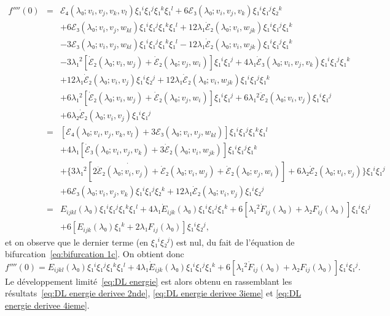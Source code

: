\documentclass[12pt, final]{amsart}
\theoremstyle{definition}
\begin{document}
\begin{eqnarray*}
  f'''' (0) & = & ℰ₄ (λ₀ ; v_i, v_j, v_k {, v_l} ) ξ₁^i
  ξ₁^j ξ₁^k ξ₁^l + 6ℰ₃ (λ₀ ; v_i, v_j, v_k) ξ₁^i
  ξ₁^j ξ₂^k\\
  &  &  + 6ℰ₃ (λ₀ ; v_i, v_j, w_{k  l})
  ξ₁^i ξ₁^j ξ₁^k ξ₁^l + 12 λ₁  \dot{ℰ}₂
  (λ₀ ; v_{i }, w_{j  k}) ξ₁^i ξ₁^j ξ₁^k\\
  &  &  - 3ℰ₃ (λ₀ ; v_i, v_j, w_{k  l})
  ξ₁^i ξ₁^j ξ₁^k ξ₁^l - 12 λ₁  \dot{ℰ}₂
  (λ₀ ; v_i, w_{j  k}) ξ₁^i ξ₁^j ξ₁^k\\
  &  &  - 3 λ₁^2  [\dot{ℰ}₂ (λ₀ ; v_i, w_j)
  + \dot{ℰ}₂ (λ₀ ; v_j, w_i)] ξ₁^i ξ₁^j + 4 λ₁
  \dot{ℰ}₃ (λ₀ ; v_i, v_j, v_k) ξ₁^i ξ₁^j ξ₁^k\\
  &  &  + 12 λ₁  \dot{ℰ}₂ (λ₀ ; v_i,
  v_j) ξ₁^i ξ₂^j + 12 λ₁  \dot{ℰ}₂ (λ₀ ;
  v_i, w_{j  k}) ξ₁^i ξ₁^j ξ₁^k\\
  &  &  + 6 λ₁^2  [\dot{ℰ}₂ (λ₀ ; v_i,
  w_j) + \dot{ℰ}₂ (λ₀ ; v_j, w_i)] ξ₁^i ξ₁^j + 6
  λ₁^2  \ddot{ℰ}₂ (λ₀ ; v_i, v_j) ξ₁^i ξ₁^j\\
  &  &  + 6 λ₂  \dot{ℰ}₂ (λ₀ ; v_i, v_j)
  ξ₁^i ξ₁^j\\
  & = & \left[ ℰ₄ (λ₀ ; v_i, v_j, v_k {, v_l} ) +
  3ℰ₃ (λ₀ ; v_i, v_j, w_{k  l}) \right] ξ₁^i
  ξ₁^j ξ₁^k ξ₁^l\\
  &  &  + 4 λ₁  [\dot{ℰ}₃ (λ₀ ; v_i, v_j,
  v_k) + 3 \dot{ℰ}₂ (λ₀ ; v_i, w_{j  k})] ξ₁^i
  ξ₁^j ξ₁^k\\
  &  &  + \{ 3 λ₁^2  [\dot{2 \ddot{ℰ}₂
  (λ₀ ; v_i, v_j) + \dot{ℰ}}₂ (λ₀ ; v_i, w_j) +
  \dot{ℰ}₂ (λ₀ ; v_j, w_i)] + 6 λ₂
  \dot{ℰ}₂ (λ₀ ; v_i, v_j) \} ξ₁^i ξ₁^j\\
  &  &  + 6ℰ₃ (λ₀ ; v_i, v_j, v_k) ξ₁^i ξ₁^j
  ξ₂^k + 12 λ₁  \dot{ℰ}₂ (λ₀ ; v_i, v_j)
  ξ₁^i ξ₂^j\\
  & = & E_{i  j  k  l} (λ₀) ξ₁^i ξ₁^j
  ξ₁^k ξ₁^l + 4 λ₁  \dot{E}_{i  j  k}
  (λ₀) ξ₁^i ξ₁^j ξ₁^k + 6 [λ₁^2  \dot{F}_{i
   j} (λ₀) + λ₂ F_{i  j} (λ₀)]
  ξ₁^i ξ₁^j\\
  &  &  + 6 [E_{i  j  k} (λ₀) ξ₁^k + 2
  λ₁ F_{i  j} (λ₀)] ξ₁^i ξ₂^j,
\end{eqnarray*}
et on observe que le dernier terme (en $ξ₁^i ξ₂^j$) est nul, du fait de
l'équation de bifurcation~\eqref{eq:bifurcation 1c}. On obtient donc
\begin{equation}
  \label{eq:DL energie derivee 4ieme} f'''' (0) = E_{i  j  k
   l} (λ₀) ξ₁^i ξ₁^j ξ₁^k ξ₁^l + 4 λ₁
  \dot{E}_{i  j  k} (λ₀) ξ₁^i ξ₁^j ξ₁^k + 6
  [λ₁^2  \dot{F}_{i  j} (λ₀) + λ₂ F_{i
   j} (λ₀)] ξ₁^i ξ₁^j .
\end{equation}
Le développement limité~\eqref{eq:DL energie} est alors obtenu en
rassemblant les résultats~\eqref{eq:DL energie derivee 2nde}, \eqref{eq:DL
energie derivee 3ieme} et \eqref{eq:DL energie derivee 4ieme}.
\end{document}
